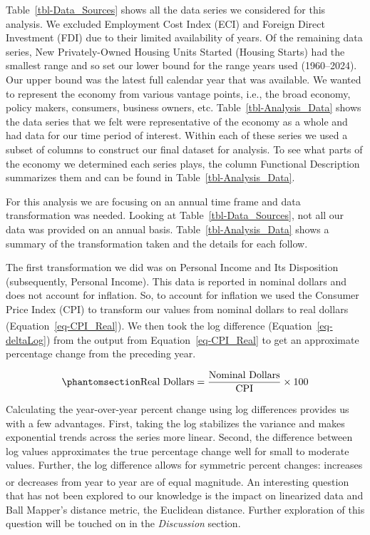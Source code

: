 \documentclass[
  10pt,
  letterpaper,
  DIV=11,
  numbers=noendperiod]{scrartcl}
\begin{document}
Table~\ref{tbl-Data_Sources} shows all the data series we considered for
this analysis. We excluded Employment Cost Index (ECI) and Foreign
Direct Investment (FDI) due to their limited availability of years. Of
the remaining data series, New Privately-Owned Housing Units Started
(Housing Starts) had the smallest range and so set our lower bound for
the range years used (1960--2024). Our upper bound was the latest full
calendar year that was available. We wanted to represent the economy
from various vantage points, i.e., the broad economy, policy makers,
consumers, business owners, etc. Table~\ref{tbl-Analysis_Data} shows the
data series that we felt were representative of the economy as a whole
and had data for our time period of interest. Within each of these
series we used a subset of columns to construct our final dataset for
analysis. To see what parts of the economy we determined each series
plays, the column Functional Description summarizes them and can be
found in Table~\ref{tbl-Analysis_Data}.

For this analysis we are focusing on an annual time frame and data
transformation was needed. Looking at Table~\ref{tbl-Data_Sources}, not
all our data was provided on an annual basis.
Table~\ref{tbl-Analysis_Data} shows a summary of the transformation
taken and the details for each follow.

The first transformation we did was on Personal Income and Its
Disposition (subsequently, Personal Income). This data is reported in
nominal dollars and does not account for inflation. So, to account for
inflation we used the Consumer Price Index (CPI) to transform our values
from nominal dollars to real dollars
(Equation~\ref{eq-CPI_Real}).\textsuperscript{}
We then took the log difference (Equation~\ref{eq-deltaLog}) from the
output from Equation~\ref{eq-CPI_Real} to get an approximate percentage
change from the preceding year.

\begin{equation}\phantomsection\label{eq-CPI_Real}{
\text{Real Dollars} = \frac{\text{Nominal Dollars}}{\text{CPI}} \times 100
}\end{equation}

Calculating the year-over-year percent change using log differences
provides us with a few advantages. First, taking the log stabilizes the
variance and makes exponential trends across the series more linear.
Second, the difference between log values approximates the true
percentage change well for small to moderate values. Further, the log
difference allows for symmetric percent changes: increases or decreases
from year to year are of equal
magnitude.\textsuperscript{}
An interesting question that has not been explored to our knowledge is
the impact on linearized data and Ball Mapper's distance metric, the
Euclidean distance. Further exploration of this question will be touched
on in the \emph{Discussion} section.
\end{document}
